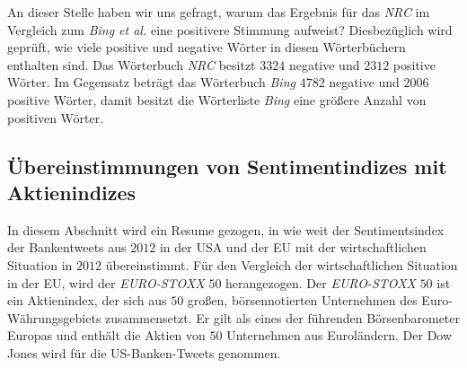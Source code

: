 An dieser Stelle haben wir uns gefragt, warum das Ergebnis für das \textit{NRC} im Vergleich zum \textit{Bing et al.} eine positivere Stimmung aufweist? Diesbezüglich wird geprüft, wie viele positive und negative Wörter in diesen Wörterbüchern enthalten sind. Das Wörterbuch \textit{NRC} besitzt $3324$ negative und $2312$ positive Wörter. Im Gegensatz beträgt das Wörterbuch \textit{Bing} $4782$ negative und $2006$ positive Wörter, damit besitzt die Wörterliste \textit{Bing} eine größere Anzahl von positiven Wörter. 

\subsection{Übereinstimmungen von Sentimentindizes mit Aktienindizes}\label{ueberein}
In diesem Abschnitt wird ein Resume gezogen, in wie weit der Sentimentsindex der Bankentweets aus $2012$ in der USA und der EU mit der wirtschaftlichen Situation in $2012$ übereinstimmt. Für den Vergleich der wirtschaftlichen Situation in der EU, wird der \textit{EURO-STOXX} $50$ herangezogen. Der \textit{EURO-STOXX} $50$ ist ein Aktienindex, der sich aus $50$ großen, börsennotierten Unternehmen des Euro-Währungsgebiets zusammensetzt. Er gilt als eines der führenden Börsenbarometer Europas und enthält die Aktien von $50$ Unternehmen aus Euroländern. Der Dow Jones wird für die US-Banken-Tweets genommen.

